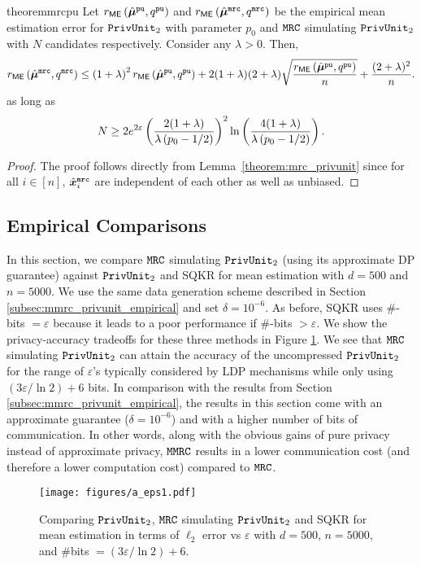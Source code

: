 \begin{restatable}{theorem}{mrcpu}
\label{thm:me_mrc_pu}
Let $r_{\mathsf{ME}} \left( \hat{{\boldsymbol{\mu}}}^\texttt{pu}, q^{\texttt{pu}} \right)$ and $r_{\mathsf{ME}} \left( \hat{{\boldsymbol{\mu}}}^\texttt{mrc}, q^{\texttt{mrc}} \right)$ be the empirical mean estimation error for \emph{$\texttt{PrivUnit}_2$} with parameter $p_0$ and \emph{$\texttt{MRC}$} simulating \emph{$\texttt{PrivUnit}_2$} with $N$ candidates respectively. Consider any $\lambda > 0$. Then,
\begin{align}
    r_{\mathsf{ME}} \left( \hat{{\boldsymbol{\mu}}}^\texttt{mrc}, q^{\texttt{mrc}} \right) \leq  
    \left( 1+\lambda \right)^2 r_{\mathsf{ME}} \left( \hat{{\boldsymbol{\mu}}}^\texttt{pu}, q^{\texttt{pu}} \right) + 2(1+\lambda)(2+\lambda) \sqrt{\frac{r_{\mathsf{ME}} \left( \hat{{\boldsymbol{\mu}}}^\texttt{pu}, q^{\texttt{pu}} \right)}{n}} + \frac{(2+\lambda)^2}{n}.
\end{align}
as long as 
\begin{align}\label{eq:N_bdd_mrc_pu}
    N \geq   2e^{2\varepsilon}\left(\frac{2 (1+\lambda)}{\lambda \left( p_0 -1/2 \right)}\right)^2 \ln\left( \frac{4(1+\lambda)}{\lambda \left( p_0 -1/2 \right)} \right).
\end{align}
\end{restatable}
\begin{proof}
The proof follows directly from Lemma~\ref{theorem:mrc_privunit} since for all $i \in [n]$, $\hat{{\boldsymbol{x}}}^{\texttt{mrc}}_i$ are independent of each other as well as unbiased.
\end{proof}

\subsection{Empirical Comparisons}
\label{appendix:mrc_pu_emp}
In this section, we compare $\texttt{MRC}$ simulating $\texttt{PrivUnit}_2$ (using its approximate DP guarantee) against $\texttt{PrivUnit}_2$ and SQKR for mean estimation with $d = 500$ and $n = 5000$. We use the same data generation scheme described in Section \ref{subsec:mmrc_privunit_empirical} and set $\delta = 10^{-6}$. As before, SQKR uses $\#$-bits $= \varepsilon$ because it leads to a poor performance if $\#$-bits $ > \varepsilon$. We show the privacy-accuracy tradeoffs for these three methods in Figure \ref{fig:a_mean}. We see that $\texttt{MRC}$ simulating $\texttt{PrivUnit}_2$ can attain the accuracy of the uncompressed $\texttt{PrivUnit}_2$ for the range of  $\varepsilon$'s typically considered by LDP mechanisms while only using $(3\varepsilon/ \ln 2) + 6$ bits. In comparison with the results from Section \ref{subsec:mmrc_privunit_empirical}, the results in this section come with an approximate guarantee ($\delta = 10^{-6}$) and with a higher number of bits of communication. In other words, along with the obvious gains of pure privacy instead of approximate privacy, $\texttt{MMRC}$ results in a lower communication cost (and therefore a lower computation cost) compared to $\texttt{MRC}$.
\begin{figure}[h]
\centering
\texttt{[image: figures/a\_eps1.pdf]}
\caption{Comparing $\texttt{PrivUnit}_2$, $\texttt{MRC}$ simulating $\texttt{PrivUnit}_2$ and SQKR for mean estimation in terms of $\ell_2$ error vs $\varepsilon$ with $d = 500$, $n = 5000$, and $\#$bits $= (3\varepsilon/ \ln 2) + 6$.}
\label{fig:a_mean}
\end{figure}

